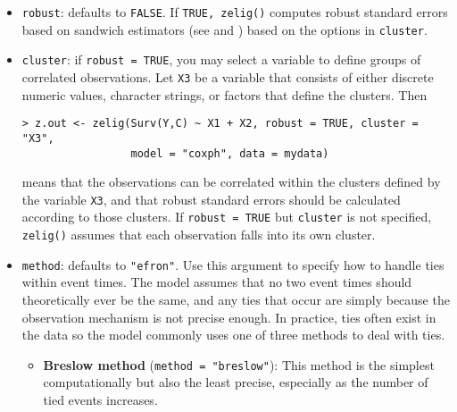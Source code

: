 \begin{itemize}
\item {\tt robust}: defaults to {\tt FALSE}.  If {\tt TRUE, zelig()} computes robust standard errors based on sandwich estimators (see \citet{Huber81} and \citet{White80}) based on the options in {\tt cluster}.

\item {\tt cluster}: if {\tt robust = TRUE}, you may select a variable to define groups of correlated observations.  Let {\tt X3} be a variable that consists of either discrete numeric values, character strings, or factors that define the clusters.  Then 

\begin{verbatim}
> z.out <- zelig(Surv(Y,C) ~ X1 + X2, robust = TRUE, cluster = "X3", 
                 model = "coxph", data = mydata)
\end{verbatim}

means that the observations can be correlated within the clusters defined by the variable {\tt X3}, and that robust standard errors should be calculated according to those clusters.  If {\tt robust = TRUE} but {\tt cluster} is not specified, {\tt zelig()} assumes that each observation falls into its own cluster.

\item {\tt method}: defaults to {\tt "efron"}.  Use this argument to specify how to handle ties within event times.  The model assumes that no two event times should theoretically ever be the same, and any ties that occur are simply because the observation mechanism is not precise enough.  In practice, ties often exist in the data so the model commonly uses one of three methods to deal with ties. 

\begin{itemize}

\item \textbf{Breslow method} ({\tt method = "breslow"}): This method is the simplest computationally but also the least precise, especially as the number of tied events increases.  


\end{itemize}
\end{itemize}
